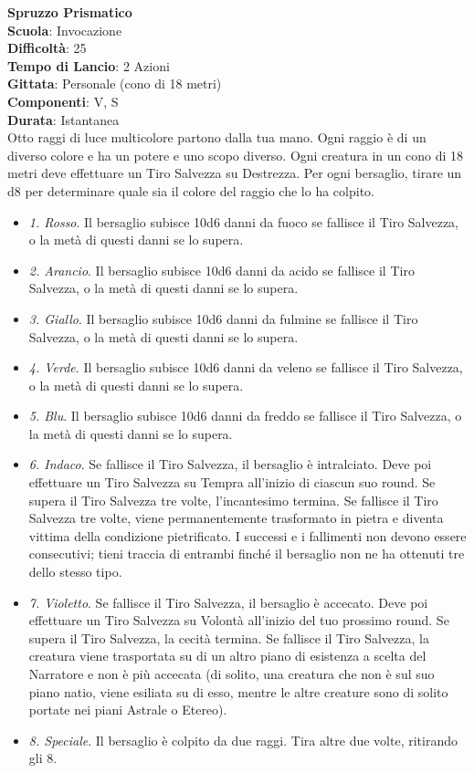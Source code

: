 \begin{multicols}{2}
\medskip\textbf{Spruzzo Prismatico}\\
\textbf{Scuola}: Invocazione\\
\textbf{Difficoltà}:  25\\
\textbf{Tempo di Lancio}: 2 Azioni\\
\textbf{Gittata}: Personale (cono di 18 metri)\\
\textbf{Componenti}: V, S\\
\textbf{Durata}: Istantanea\\
Otto raggi di luce multicolore partono dalla tua mano. Ogni raggio è di un diverso colore e ha un potere e uno scopo diverso. Ogni creatura in un cono di 18 metri deve effettuare un Tiro Salvezza su Destrezza. Per ogni bersaglio, tirare un d8 per determinare quale sia il colore del raggio che lo ha colpito.\\
\medskip
\begin{itemize}
\item
\textit{1. Rosso}. Il bersaglio subisce 10d6 danni da fuoco se fallisce il Tiro Salvezza, o la metà di questi danni se lo supera.
\item
\textit{2. Arancio}. Il bersaglio subisce 10d6 danni da acido se fallisce il Tiro Salvezza, o la metà di questi danni se lo supera.
\item
\textit{3. Giallo}. Il bersaglio subisce 10d6 danni da fulmine se fallisce il Tiro Salvezza, o la metà di questi danni se lo supera.
\item
\textit{4. Verde}. Il bersaglio subisce 10d6 danni da veleno se fallisce il Tiro Salvezza, o la metà di questi danni se lo supera.
\item
\textit{5. Blu}. Il bersaglio subisce 10d6 danni da freddo se fallisce il Tiro Salvezza, o la metà di questi danni se lo supera.
\item
\textit{6. Indaco}. Se fallisce il Tiro Salvezza, il bersaglio è intralciato. Deve poi effettuare un Tiro Salvezza su Tempra all'inizio di ciascun suo round. Se supera il Tiro Salvezza tre volte, l'incantesimo termina. Se fallisce il Tiro Salvezza tre volte, viene permanentemente trasformato in pietra e diventa vittima della condizione pietrificato. I successi e i fallimenti non devono essere consecutivi; tieni traccia di entrambi finché il bersaglio non ne ha ottenuti tre dello stesso tipo.
\item
\textit{7. Violetto}. Se fallisce il Tiro Salvezza, il bersaglio è accecato. Deve poi effettuare un Tiro Salvezza su Volontà all'inizio del tuo prossimo round. Se supera il Tiro Salvezza, la cecità termina. Se fallisce il Tiro Salvezza, la creatura viene trasportata su di un altro piano di esistenza a scelta del Narratore e non è più accecata (di solito, una creatura che non è sul suo piano natio, viene esiliata su di esso, mentre le altre creature sono di solito portate nei piani Astrale o Etereo).
\item
\textit{8. Speciale}. Il bersaglio è colpito da due raggi. Tira altre due volte, ritirando gli 8.
\end{itemize}


\end{multicols}

